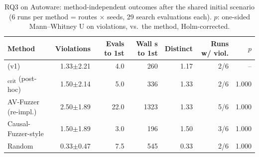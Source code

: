 \begin{table}[t]
\centering
\small
\caption{RQ3 on Autoware: method-independent outcomes after the shared initial scenario (6 runs per method = routes $\times$ seeds, 29 search evaluations each). $p$: one-sided Mann--Whitney U on violations, \toolname{} vs.\ the method, Holm-corrected.}
\label{tab:rq3-results}
\begin{tabular}{@{}lrrrrrr@{}}
\toprule
Method & Violations & Evals to 1st & Wall s to 1st & Distinct & Runs w/ viol. & $p$ \\
\midrule
\toolname{} (v1) & 1.33$\pm$2.21 & 4.0 & 260 & 1.17 & 2/6 & -- \\
\toolname{}\textsubscript{crit} (post-hoc) & 1.50$\pm$2.14 & 5.0 & 336 & 1.33 & 2/6 & 1.000 \\
AV-Fuzzer (re-impl.) & 2.50$\pm$1.89 & 22.0 & 1323 & 1.33 & 5/6 & 1.000 \\
Causal-Fuzzer-style & 1.50$\pm$1.89 & 3.0 & 196 & 1.50 & 3/6 & 1.000 \\
Random & 0.33$\pm$0.47 & 7.5 & 545 & 0.33 & 2/6 & 1.000 \\
\bottomrule
\end{tabular}
\end{table}
